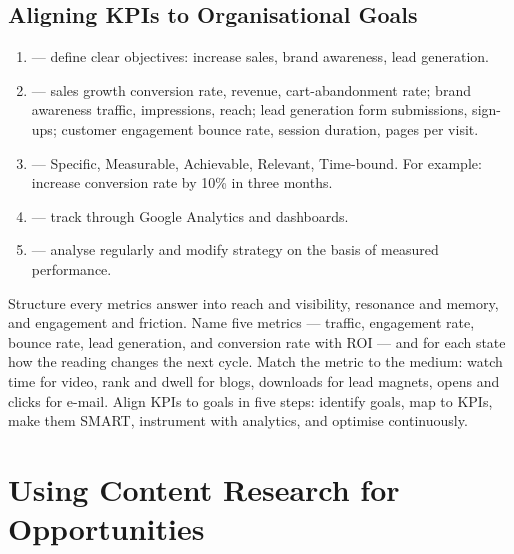 \documentclass{MMTextbook}
\begin{document}
\section{Aligning KPIs to Organisational Goals}

\begin{exambox}
\begin{enumerate}
\item {} --- define clear objectives: increase sales,
      brand awareness, lead generation.
\item {} --- sales growth \ra{} conversion rate,
      revenue, cart-abandonment rate; brand awareness \ra{} traffic,
      impressions, reach; lead generation \ra{} form submissions, sign-ups;
      customer engagement \ra{} bounce rate, session duration, pages per visit.
\item {} --- Specific, Measurable, Achievable, Relevant,
      Time-bound. For example: increase conversion rate by 10\% in three months.
\item {} --- track through Google Analytics and
      dashboards.
\item {} --- analyse regularly and modify
      strategy on the basis of measured performance.
\end{enumerate}
\end{exambox}

\begin{summarybox}
Structure every metrics answer into reach and visibility, resonance and memory,
and engagement and friction. Name five metrics --- traffic, engagement rate,
bounce rate, lead generation, and conversion rate with ROI --- and for each state
how the reading changes the next cycle. Match the metric to the medium: watch
time for video, rank and dwell for blogs, downloads for lead magnets, opens and
clicks for e-mail. Align KPIs to goals in five steps: identify goals, map to
KPIs, make them SMART, instrument with analytics, and optimise continuously.
\end{summarybox}

\chapter{Using Content Research for Opportunities}
\end{document}
